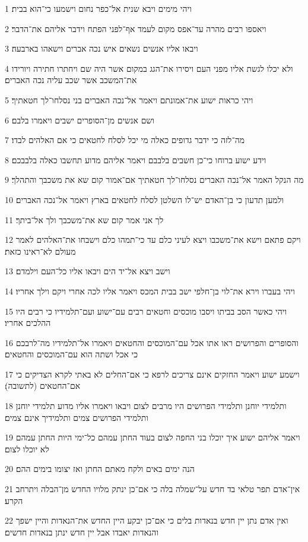 \par 1 ויהי מימים ויבא שנית אל־כפר נחום וישמעו כי־הוא בבית׃
\par 2 ויאספו רבים מהרה עד־אפס מקום לעמד אף־לפני הפתח וידבר אליהם את־הדבר׃
\par 3 ויבאו אליו אנשים נשאים איש נכה אברים וישאהו בארבעה׃
\par 4 ולא יכלו לגשת אליו מפני העם ויסירו את־הגג במקום אשר היה שם ויחתרו חתירה ויורידו את־המשכב אשר שכב עליה נכה האברים׃
\par 5 ויהי כראות ישוע את־אמונתם ויאמר אל־נכה האברים בני נסלחו־לך חטאתיך׃
\par 6 ושם אנשים מן־הסופרים ישבים ויאמרו בלבם׃
\par 7 מה־לזה כי ידבר גדופים כאלה מי יכל לסלח לחטאים כי אם האלהים לבדו׃
\par 8 וידע ישוע ברוחו כי־כן חשבים בלבבם ויאמר אליהם מדוע תחשבו כאלה בלבבכם׃
\par 9 מה הנקל האמר אל־נכה האברים נסלחו־לך חטאתיך אם־אמור קום שא את משכבך והתהלך׃
\par 10 ולמען תדעון כי בן־האדם יש־לו השלטן לסלח לחטאים בארץ ויאמר אל־נכה האברים׃
\par 11 לך אני אמר קום שא את־משכבך ולך אל־ביתך׃
\par 12 ויקם פתאם וישא את־משכבו ויצא לעיני כלם עד כי־תמהו כלם וישבחו את־האלהים לאמר מעולם לא־ראינו כזאת׃
\par 13 וישב ויצא אל־יד הים ויבאו אליו כל־העם וילמדם׃
\par 14 ויהי בעברו וירא את־לוי בן־חלפי ישב בבית המכס ויאמר אליו לכה אחרי ויקם וילך אחריו׃
\par 15 ויהי כאשר הסב בביתו ויסבו מוכסים וחטאים רבים עם־ישוע ועם־תלמידיו כי רבים היו ההלכים אחריו׃
\par 16 והסופרים והפרושים ראו אתו אכל עם־המוכסים והחטאים ויאמרו אל־תלמידיו מה־לרבכם כי אכל ושתה הוא עם־המוכסים והחטאים׃
\par 17 וישמע ישוע ויאמר החזקים אינם צריכים לרפא כי אם־החלים לא באתי לקרא הצדיקים כי אם־החטאים (לתשובה)׃
\par 18 ותלמידי יוחנן ותלמידי הפרושים היו מרבים לצום ויבאו ויאמרו אליו מדוע תלמידי יוחנן ותלמידי הפרושים צמים ותלמידיך אינם צמים׃
\par 19 ויאמר אליהם ישוע איך יוכלו בני החפה לצום בעוד החתן עמהם כל־ימי היות החתן עמהם לא יוכלו לצום׃
\par 20 הנה ימים באים ולקח מאתם החתן ואז יצומו בימים ההם׃
\par 21 אין־אדם תפר טלאי בד חדש על־שמלה בלה כי אם־כן ינתק מלויו החדש מן־הבלה ויתרחב הקרע׃
\par 22 ואין אדם נתן יין חדש בנאדות בלים כי אם־כן יבקע היין החדש את־הנאדות והיין ישפך והנאדות יאבדו אבל יין חדש ינתן בנאדות חדשים׃
